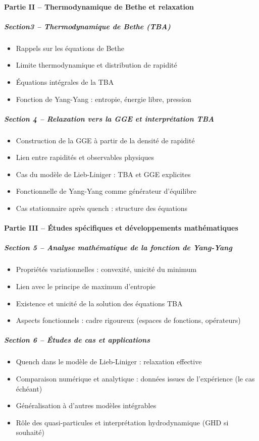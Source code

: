\paragraph{Partie II – Thermodynamique de Bethe et relaxation}

\subparagraph{Section3 – Thermodynamique de Bethe (TBA)}
\begin{itemize}
    \item Rappels sur les équations de Bethe
    \item Limite thermodynamique et distribution de rapidité
    \item Équations intégrales de la TBA
    \item Fonction de Yang-Yang : entropie, énergie libre, pression
\end{itemize}

\subparagraph{Section 4 – Relaxation vers la GGE et interprétation TBA}
\begin{itemize}
    \item Construction de la GGE à partir de la densité de rapidité
    \item Lien entre rapidités et observables physiques
    \item Cas du modèle de Lieb-Liniger : TBA et GGE explicites
    \item Fonctionnelle de Yang-Yang comme générateur d’équilibre
    \item Cas stationnaire après quench : structure des équations
\end{itemize}

\paragraph{Partie III – Études spécifiques et développements mathématiques}

\subparagraph{Section 5 – Analyse mathématique de la fonction de Yang-Yang}
\begin{itemize}
    \item Propriétés variationnelles : convexité, unicité du minimum
    \item Lien avec le principe de maximum d’entropie
    \item Existence et unicité de la solution des équations TBA
    \item Aspects fonctionnels : cadre rigoureux (espaces de fonctions, opérateurs)
\end{itemize}

\subparagraph{Section 6 – Études de cas et applications}
\begin{itemize}
    \item Quench dans le modèle de Lieb-Liniger : relaxation effective
    \item Comparaison numérique et analytique : données issues de l’expérience (le cas échéant)
    \item Généralisation à d’autres modèles intégrables
    \item Rôle des quasi-particules et interprétation hydrodynamique (GHD si souhaité)
\end{itemize}

